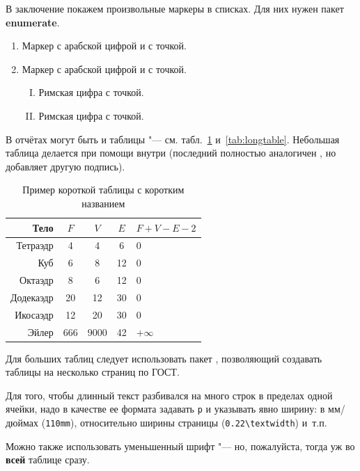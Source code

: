 В заключение покажем произвольные маркеры в списках. Для них нужен пакет \textbf{enumerate}.
\begin{enumerate}[1.]
\item Маркер с арабской цифрой и с точкой.
\item Маркер с арабской цифрой и с точкой.
\begin{enumerate}[I.]
\item Римская цифра с точкой.
\item Римская цифра с точкой.
\end{enumerate}
\end{enumerate}

В отчётах могут быть и таблицы "--- см. табл.~\ref{tab:tabular} и~\ref{tab:longtable}.
Небольшая таблица делается при помощи  внутри  (последний
полностью аналогичен , но добавляет другую подпись).

\begin{table}[ht]
  \caption{Пример короткой таблицы с коротким названием}
  \begin{tabular}{|r|c|c|c|l|}
  \hline
  Тело      & $F$ & $V$  & $E$ & $F+V-E-2$ \\
  \hline
  Тетраэдр  & 4   & 4    & 6   & 0         \\
  Куб       & 6   & 8    & 12  & 0         \\
  Октаэдр   & 8   & 6    & 12  & 0         \\
  Додекаэдр & 20  & 12   & 30  & 0         \\
  Икосаэдр  & 12  & 20   & 30  & 0         \\
  \hline
  Эйлер     & 666 & 9000 & 42  & $+\infty$ \\
  \hline
  \end{tabular}
  \label{tab:tabular}
\end{table}

Для больших таблиц следует использовать пакет , позволяющий создавать
таблицы на несколько страниц по ГОСТ.

Для того, чтобы длинный текст разбивался на много строк в пределах одной ячейки, надо в
качестве ее формата задавать \texttt{p} и указывать явно ширину: в мм/дюймах
(\texttt{110mm}), относительно ширины страницы (\texttt{0.22\textbackslash textwidth})
и~т.п.

Можно также использовать уменьшенный шрифт "--- но, пожалуйста, тогда уж во \textbf{всей}
таблице сразу.

